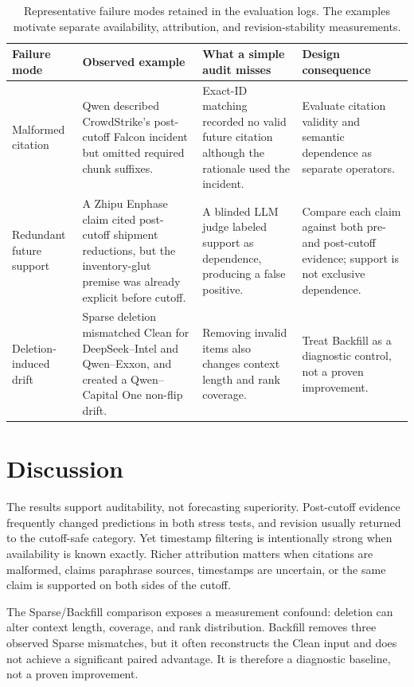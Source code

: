 \documentclass[10pt,twocolumn]{article}
\begin{document}
\begin{table}[t]
\centering
\small
\begin{tabularx}{\textwidth}{@{}p{}p{}p{}Y@{}}
\toprule
Failure mode & Observed example & What a simple audit misses & Design consequence \\
\midrule
Malformed citation & Qwen described CrowdStrike's post-cutoff Falcon incident but
omitted required chunk suffixes. & Exact-ID matching recorded no valid future
citation although the rationale used the incident. & Evaluate citation validity and
semantic dependence as separate operators. \\
Redundant future support & A Zhipu Enphase claim cited post-cutoff shipment reductions,
but the inventory-glut premise was already explicit before cutoff. & A blinded LLM
judge labeled support as dependence, producing a false positive. & Compare each claim
against both pre- and post-cutoff evidence; support is not exclusive dependence. \\
Deletion-induced drift & Sparse deletion mismatched Clean for DeepSeek--Intel and
Qwen--Exxon, and created a Qwen--Capital One non-flip drift. & Removing invalid items
also changes context length and rank coverage. & Treat Backfill as a diagnostic
control, not a proven improvement. \\
\bottomrule
\end{tabularx}
\caption{Representative failure modes retained in the evaluation logs. The examples
motivate separate availability, attribution, and revision-stability measurements.}
\label{tab:failures}
\end{table}

\section{Discussion}

The results support auditability, not forecasting superiority. Post-cutoff evidence
frequently changed predictions in both stress tests, and revision usually returned to
the cutoff-safe category. Yet timestamp filtering is intentionally strong when
availability is known exactly. Richer attribution matters when citations are
malformed, claims paraphrase sources, timestamps are uncertain, or the same claim is
supported on both sides of the cutoff.

The Sparse/Backfill comparison exposes a measurement confound: deletion can alter
context length, coverage, and rank distribution. Backfill removes three observed
Sparse mismatches, but it often reconstructs the Clean input and does not achieve a
significant paired advantage. It is therefore a diagnostic baseline, not a proven
improvement.
\end{document}
